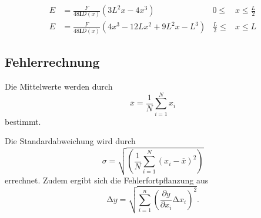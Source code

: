 \begin{align}
  E &= \frac{F}{48\symbf{I}D(x)}\left(3L^2x-4x^3\right)& 0 \leq &x \leq \frac{L}{2}
  \label{eqn:beidseitigl}\\
  E &= \frac{F}{48\symbf{I}D(x)}\left(4x^3-12Lx^2+9L^2x-L^3\right) & \frac{L}{2} \leq &x \leq L
  \label{eqn:beidseitigr}
\end{align}

\subsection{Fehlerrechnung}

Die Mittelwerte werden durch
\begin{equation}
  \overline{x} =\frac{1}{N}\sum_{i=1}^{N} x_i
  \label{eqn:mean}
\end{equation}
bestimmt.

Die Standardabweichung wird durch
\begin{equation}
  \sigma = \sqrt{\left(\frac{1}{N}\sum_{i=1}^{N}(x_i-\overline{x})^2\right)}
  \label{eqn:std}
\end{equation}
 errechnet.
 Zudem ergibt sich die Fehlerfortpflanzung aus
 \begin{equation}
   \increment y = \sqrt{\sum_{i=1}^{n}\left(\frac{\partial y}{\partial x_i}
   \increment x_i\right)^2}
   \label{eqn:gauss}.
\end{equation}
